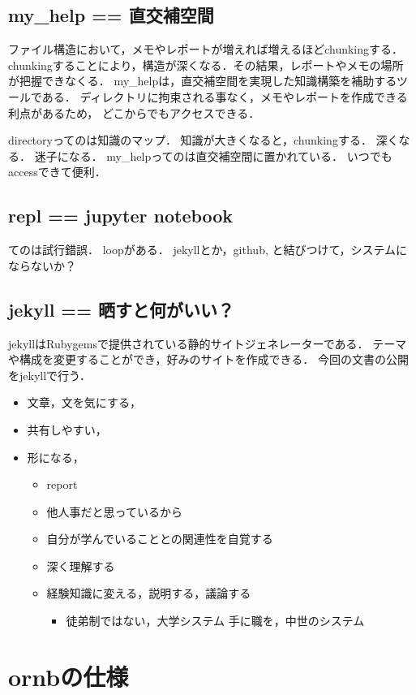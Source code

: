 \documentclass{hissymp}
\begin{document}
\subsection{my\_help == 直交補空間}
\label{sec:orgfbe8a76}
ファイル構造において，メモやレポートが増えれば増えるほどchunkingする．
chunkingすることにより，構造が深くなる．その結果，レポートやメモの場所
が把握できなくる．
my\_helpは，直交補空間を実現した知識構築を補助するツールである．
ディレクトリに拘束される事なく，メモやレポートを作成できる利点があるため，
どこからでもアクセスできる．



directoryってのは知識のマップ．
知識が大きくなると，chunkingする．
深くなる．
迷子になる．
my\_helpってのは直交補空間に置かれている．
いつでもaccessできて便利．

\subsection{repl == jupyter notebook}
\label{sec:org8d2029a}
てのは試行錯誤．
loopがある．
jekyllとか，github, と結びつけて，システムにならないか？

\subsection{jekyll == 晒すと何がいい？}
\label{sec:org17230c7}
jekyllはRubygemsで提供されている静的サイトジェネレーターである．
テーマや構成を変更することができ，好みのサイトを作成できる．
今回の文書の公開をjekyllで行う．
\begin{itemize}
\item 文章，文を気にする，
\item 共有しやすい，
\item 形になる，
\begin{itemize}
\item report
\item 他人事だと思っているから
\item 自分が学んでいることとの関連性を自覚する
\item 深く理解する
\item 経験知識に変える，説明する，議論する
\begin{itemize}
\item 徒弟制ではない，大学システム
手に職を，中世のシステム
\end{itemize}
\end{itemize}
\end{itemize}

\section{ornbの仕様}
\label{sec:org0766e3d}
\end{document}
